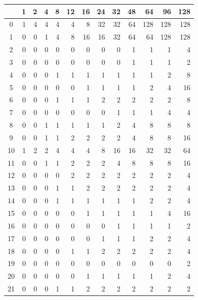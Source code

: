 \documentclass[11pt,a4paper,openright,twoside]{book}
\numberwithin{equation}{section} %
\numberwithin{figure}{section} %
\numberwithin{table}{section} %
\begin{document}
\begin{table}[ht]
	\centering
	\small
	\def\arraystretch{0.85}
	\begin{tabular}{c|rrrrrrrrrrrr}
		\diagbox{\acs{IPM}}{System} &
		1 & 2 & 4 & 8  & 12 & 16 & 24 & 32 & 48 & 64 & 96 & 128 \\
		\hline
		0  & 1 & 4 & 4 & 4 & 4 & 8  & 32 & 32 & 64 & 128 & 128 & 128 \\
		1  & 0 & 0 & 1 & 4 & 8 & 16 & 16 & 32 & 64 & 64  & 128 & 128 \\
		2  & 0 & 0 & 0 & 0 & 0 & 0  & 0  & 0  & 1  & 1   & 1   & 4 \\
		3  & 0 & 0 & 0 & 0 & 0 & 0  & 0  & 0  & 1  & 1   & 1   & 2 \\
		4  & 0 & 0 & 0 & 1 & 1 & 1  & 1  & 1  & 1  & 1   & 2   & 8 \\
		5  & 0 & 0 & 0 & 0 & 0 & 1  & 1  & 1  & 1  & 2   & 4   & 16 \\
		6  & 0 & 0 & 0 & 1 & 1 & 1  & 2  & 2  & 2  & 2   & 2   & 8 \\
		7  & 0 & 0 & 0 & 0 & 0 & 0  & 0  & 1  & 1  & 1   & 4   & 4 \\
		8  & 0 & 0 & 1 & 1 & 1 & 1  & 1  & 2  & 4  & 8   & 8   & 8 \\
		9  & 0 & 0 & 1 & 1 & 2 & 2  & 2  & 2  & 4  & 8   & 8   & 16 \\
		10 & 1 & 2 & 2 & 4 & 4 & 4  & 8  & 16 & 16 & 32  & 32  & 64 \\
		11 & 0 & 0 & 1 & 1 & 2 & 2  & 2  & 4  & 8  & 8   & 8   & 16 \\
		12 & 0 & 0 & 0 & 0 & 2 & 2  & 2  & 2  & 2  & 2   & 2   & 4 \\
		13 & 0 & 0 & 0 & 1 & 1 & 2  & 2  & 2  & 2  & 2   & 2   & 4 \\
		14 & 0 & 0 & 0 & 1 & 1 & 1  & 1  & 1  & 1  & 2   & 2   & 4 \\
		15 & 0 & 0 & 0 & 0 & 0 & 1  & 1  & 1  & 1  & 1   & 4   & 16 \\
		16 & 0 & 0 & 0 & 0 & 0 & 0  & 0  & 1  & 1  & 1   & 1   & 2 \\
		17 & 0 & 0 & 0 & 0 & 0 & 0  & 1  & 1  & 1  & 2   & 2   & 4 \\
		18 & 0 & 0 & 0 & 0 & 1 & 1  & 2  & 2  & 2  & 2   & 2   & 4 \\
		19 & 0 & 0 & 0 & 0 & 0 & 0  & 0  & 0  & 0  & 0   & 0   & 2 \\
		20 & 0 & 0 & 0 & 0 & 0 & 1  & 1  & 1  & 1  & 1   & 2   & 4 \\
		21 & 0 & 0 & 0 & 1 & 1 & 2  & 2  & 2  & 2  & 2   & 2   & 2 \\

\end{tabular}
\end{table}
\end{document}

